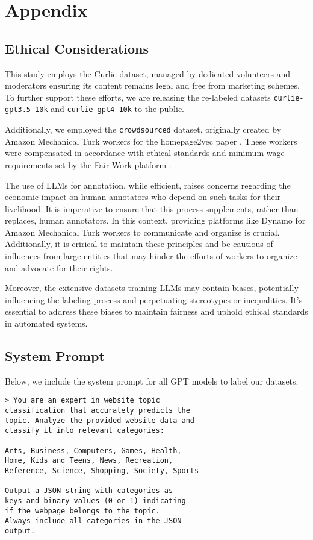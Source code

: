 \section{Appendix}
\subsection{Ethical Considerations}\label{appendix:ethical-considerations}
This study employs the Curlie dataset, managed by dedicated volunteers and moderators ensuring its content remains legal and free from marketing schemes. 
To further support these efforts, we are releasing the re-labeled datasets \texttt{curlie-gpt3.5-10k} and \texttt{curlie-gpt4-10k} to the public.

Additionally, we employed the \texttt{crowdsourced} dataset, originally created by Amazon Mechanical Turk workers for the homepage2vec paper \cite{homepage2vec}. 
These workers were compensated in accordance with ethical standards and minimum wage requirements set by the Fair Work platform \cite{ethics2}.

The use of LLMs for annotation, while efficient, raises concerns regarding the economic impact on human annotators who depend on such tasks for their livelihood. 
It is imperative to ensure that this process supplements, rather than replaces, human annotators. In this context, providing platforms like Dynamo \cite{ethics1} for Amazon Mechanical Turk workers to communicate and organize is crucial.
Additionally, it is crirical to maintain these principles and be cautious of influences from large entities that may hinder the efforts of workers to organize and advocate for their rights.

Moreover, the extensive datasets training LLMs may contain biases, potentially influencing the labeling process and perpetuating stereotypes or inequalities. 
It's essential to address these biases to maintain fairness and uphold ethical standards in automated systems.


\subsection{System Prompt}\label{app:system-prompt}
Below, we include the system prompt for all GPT models to label our datasets.

\begin{verbatim}
> You are an expert in website topic 
classification that accurately predicts the 
topic. Analyze the provided website data and 
classify it into relevant categories:

Arts, Business, Computers, Games, Health, 
Home, Kids and Teens, News, Recreation, 
Reference, Science, Shopping, Society, Sports

Output a JSON string with categories as
keys and binary values (0 or 1) indicating 
if the webpage belongs to the topic. 
Always include all categories in the JSON 
output.
\end{verbatim}

